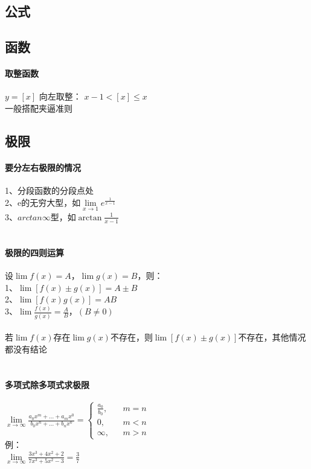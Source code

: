 \documentclass{article}
\begin{document}
\begin{flushleft}
\LARGE

\section{公式}

\subsection{函数}

\paragraph{取整函数}
$y=[x]$ 向左取整： $x-1<[x]\leq x$\\
一般搭配夹逼准则\\\huge

\subsection{极限}

\paragraph{要分左右极限的情况}
1、分段函数的分段点处\\
2、e的无穷大型，如$\lim\limits_{x\to 1} e^{\frac{1}{x-1}}$\\
3、$arctan\infty$型，如$\arctan{\frac{1}{x-1}}$\\
~\\
\paragraph{极限的四则运算}
设$\lim f(x)=A，\lim g(x)=B$，则：\\
1、$\lim [f(x)\pm g(x)]=A\pm B$\\
2、$\lim [f(x)g(x)]=AB$\\
3、$\lim \frac{f(x)}{g(x)} =\frac{A}{B}，(B\neq 0)$\\
~\\
若$\lim f(x)$存在$\lim g(x)$不存在，则$\lim [f(x)\pm g(x)]$不存在，其他情况都没有结论\\
~\\
\paragraph{多项式除多项式求极限}
$\lim\limits_{x\to \infty} \frac{a_0x^m+...+a_mx^0}{b_0x^n+...+b_nx^0}=
\left\{
\begin{array}{rcl}
\frac{a_0}{b_0},& & {m=n}\\
0,& & {m<n}\\
\infty,& & {m>n}
\end{array} \right.$\\
例：\\
$\lim\limits_{x\to \infty} \frac{3x^3+4x^2+2}{7x^3+5x^2-3} = \frac{3}{7}$\\
~\\

\end{flushleft}
\end{document}
